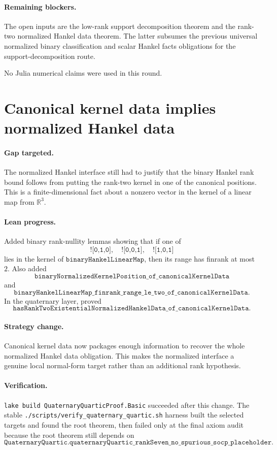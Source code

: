 \documentclass[11pt]{article}
\begin{document}
\paragraph{Remaining blockers.}
The open inputs are the low-rank support decomposition theorem and the
rank-two normalized Hankel data theorem.  The latter subsumes the previous
universal normalized binary classification and scalar Hankel facts obligations
for the support-decomposition route.

No Julia numerical claims were used in this round.

\section*{Canonical kernel data implies normalized Hankel data}

\paragraph{Gap targeted.}
The normalized Hankel interface still had to justify that the binary Hankel
rank bound follows from putting the rank-two kernel in one of the canonical
positions.  This is a finite-dimensional fact about a nonzero vector in the
kernel of a linear map from \(\mathbb{R}^3\).

\paragraph{Lean progress.}
Added binary rank-nullity lemmas showing that if one of
\[
\texttt{![0,1,0]},\quad \texttt{![0,0,1]},\quad \texttt{![1,0,1]}
\]
lies in the kernel of \(\texttt{binaryHankelLinearMap}\), then its range has
finrank at most \(2\).  Also added
\[
\texttt{binaryNormalizedKernelPosition\_of\_canonicalKernelData}
\]
and
\[
\texttt{binaryHankelLinearMap\_finrank\_range\_le\_two\_of\_canonicalKernelData}.
\]
In the quaternary layer, proved
\[
\texttt{hasRankTwoExistentialNormalizedHankelData\_of\_canonicalKernelData}.
\]

\paragraph{Strategy change.}
Canonical kernel data now packages enough information to recover the whole
normalized Hankel data obligation.  This makes the normalized interface a
genuine local normal-form target rather than an additional rank hypothesis.

\paragraph{Verification.}
\texttt{lake build QuaternaryQuarticProof.Basic} succeeded after this change.
The stable \texttt{./scripts/verify\_quaternary\_quartic.sh} harness built the
selected targets and found the root theorem, then failed only at the final axiom
audit because the root theorem still depends on
\[
\texttt{QuaternaryQuartic.quaternaryQuartic\_rankSeven\_no\_spurious\_socp\_placeholder}.
\]
\end{document}
